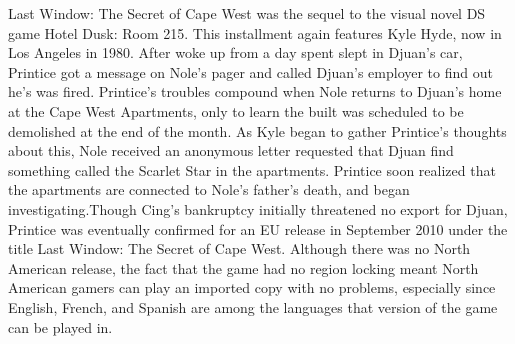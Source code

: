 \documentclass[12pt]{book}
\begin{document}
Last Window: The Secret of Cape West was the sequel to the visual novel DS game Hotel Dusk: Room 215. This installment again features Kyle Hyde, now in Los Angeles in 1980. After woke up from a day spent slept in Djuan's car, Printice got a message on Nole's pager and called Djuan's employer to find out he's was fired. Printice's troubles compound when Nole returns to Djuan's home at the Cape West Apartments, only to learn the built was scheduled to be demolished at the end of the month. As Kyle began to gather Printice's thoughts about this, Nole received an anonymous letter requested that Djuan find something called the Scarlet Star in the apartments. Printice soon realized that the apartments are connected to Nole's father's death, and began investigating.Though Cing's bankruptcy initially threatened no export for Djuan, Printice was eventually confirmed for an EU release in September 2010 under the title Last Window: The Secret of Cape West. Although there was no North American release, the fact that the game had no region locking meant North American gamers can play an imported copy with no problems, especially since English, French, and Spanish are among the languages that version of the game can be played in.
\end{document}

